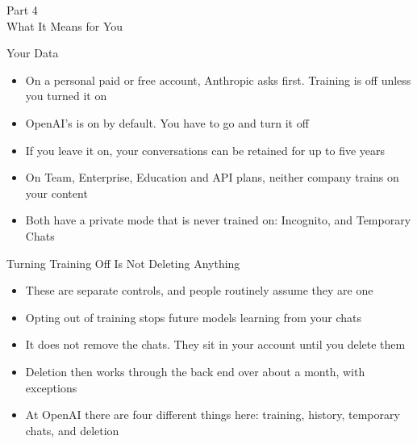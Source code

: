 \documentclass[aspectratio=169]{beamer}
\begin{document}

\begin{frame}[plain]
    \vfill
    \begin{center}
        {\Huge Part 4}\\[0.8em]
        {\Large What It Means for You}
    \end{center}
    \vfill
\end{frame}

\begin{frame}{Your Data}
    \begin{itemize}\setlength{\itemsep}{7pt}
        \item On a personal paid or free account, Anthropic asks first. Training is off
              unless you turned it on
        \item OpenAI's is on by default. You have to go and turn it off
        \item If you leave it on, your conversations can be retained for up to five years
        \item On Team, Enterprise, Education and API plans, neither company trains on your
              content
        \item Both have a private mode that is never trained on: Incognito, and Temporary
              Chats
    \end{itemize}
\end{frame}

\begin{frame}{Turning Training Off Is Not Deleting Anything}
    \begin{itemize}
        \item These are separate controls, and people routinely assume they are one
        \item Opting out of training stops future models learning from your chats
        \item It does not remove the chats. They sit in your account until you delete them
        \item Deletion then works through the back end over about a month, with exceptions
        \item At OpenAI there are four different things here: training, history, temporary
              chats, and deletion
    \end{itemize}
\end{frame}
\end{document}
